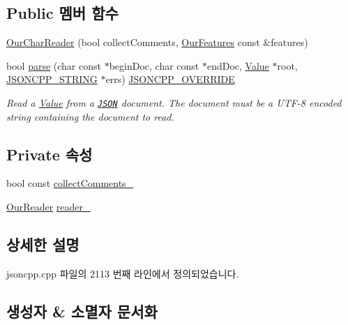 \subsection*{Public 멤버 함수}
\begin{DoxyCompactItemize}
\item 
\hyperlink{class_json_1_1_our_char_reader_a5015506620e7ba7bab417756fa1ca9fe}{Our\+Char\+Reader} (bool collect\+Comments, \hyperlink{class_json_1_1_our_features}{Our\+Features} const \&features)
\item 
bool \hyperlink{class_json_1_1_our_char_reader_a547f08ec5a9951ca69e8bb2e90296c83}{parse} (char const $\ast$begin\+Doc, char const $\ast$end\+Doc, \hyperlink{class_json_1_1_value}{Value} $\ast$root, \hyperlink{json_8h_a1e723f95759de062585bc4a8fd3fa4be}{J\+S\+O\+N\+C\+P\+P\+\_\+\+S\+T\+R\+I\+NG} $\ast$errs) \hyperlink{json_8h_a824d6199c91488107e443226fa6022c5}{J\+S\+O\+N\+C\+P\+P\+\_\+\+O\+V\+E\+R\+R\+I\+DE}
\begin{DoxyCompactList}\small\item\em Read a \hyperlink{class_json_1_1_value}{Value} from a \href{http://www.json.org}{\tt J\+S\+ON} document. The document must be a U\+T\+F-\/8 encoded string containing the document to read. \end{DoxyCompactList}\end{DoxyCompactItemize}
\subsection*{Private 속성}
\begin{DoxyCompactItemize}
\item 
bool const \hyperlink{class_json_1_1_our_char_reader_aa6afd3d0f754cadad0f6d2be38bcfee0}{collect\+Comments\+\_\+}
\item 
\hyperlink{class_json_1_1_our_reader}{Our\+Reader} \hyperlink{class_json_1_1_our_char_reader_aedd4520b8570654ed7aa0726075ee58d}{reader\+\_\+}
\end{DoxyCompactItemize}


\subsection{상세한 설명}


jsoncpp.\+cpp 파일의 2113 번째 라인에서 정의되었습니다.



\subsection{생성자 \& 소멸자 문서화}
\mbox{\label{class_json_1_1_our_char_reader_a5015506620e7ba7bab417756fa1ca9fe}} 

